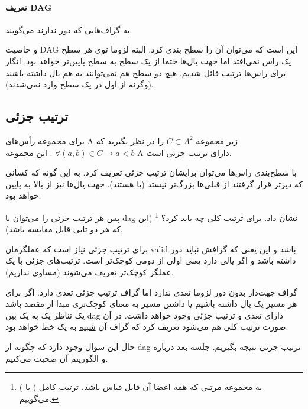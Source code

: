 \paragraph{تعریف DAG}
به گراف‌هایی که دور ندارند 
می‌گویند. 

و خاصیت 
DAG
این است که می‌توان آن را سطح بندی کرد.
البته لزوما توی هر سطح یک راس نمی‌افتد اما جهت یال‌ها حتما از یک سطح به سطح پایین‌تر خواهد بود.
انگار برای راس‌ها ترتیب قائل شدیم. 
هیچ دو سطح هم نمی‌توانند به هم یال داشته باشند (وگرنه از اول در یک سطح وارد نمی‌شدند).

\subsection{ترتیب جزئی}
برای مجموعه رأس‌های A زیر مجموعه
$C \subset A^2$
 را در نظر بگیرید که 
$\forall (a,b) \in C \rightarrow a < b$
.
این مجموعه A دارای ترتیب جزئی است.

با سطح‌بندی راس‌ها می‌توان برایشان ترتیب جزئی تعریف کرد.
به این گونه که کسانی که دیرتر قرار گرفتند از قبلی‌ها بزرگ‌تر نیستد (یا هستند).
جهت یال‌ها نیز از بالا به پایین خواهد بود.

پس هر ترتیب جزئی را می‌توان با dag نشان داد. 
برای ترتیب کلی چه باید کرد؟
\footnote{
به مجموعه مرتبی که همه اعضا آن قابل قیاس باشد، ترتیب کامل (
 یا 
) می‌گوییم.
}
(این که هر دو تایی قابل مقایسه باشد).

برای ترتیب جزئی نیاز است که عملگرمان valid باشد و این یعنی که گرافش نباید دور داشته باشد و اگر یالی
دارد یعنی اولی از دومی کوچک‌تر است.
ترتیب‌های جزئی با یک عملگر کوچک‌تر تعریف می‌شوند (مساوی نداریم).

%
%

گراف جهت‌دار بدون دور لزوما تعدی ندارد اما گراف ترتیب جزئی تعدی دارد.
اگر برای هر مسیر یک یال داشته باشیم یا داشتن مسیر به معنای کوچک‌تری مبدا از مقصد باشد
یک تناظر یک‌ به یک بین 
dag 
دارای تعدی
و ترتیب جزئی 
وجود خواهد داشت.
در آن صورت ترتیب کلی هم می‌شود تعریف کرد 
که گراف آن
\underline{شبیه} 
به یک خط خواهد بود.

حال این سوال وجود دارد که چگونه از 
dag
ترتیب‌ جزئی نتیجه بگیریم.
جلسه بعد درباره  
و الگوریتم آن
صحبت می‌کنیم.

